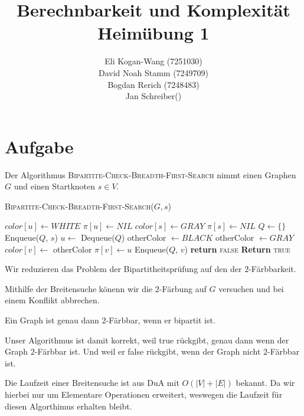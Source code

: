 \documentclass{article}
\newcommand{\zettelNummer}{1}
\newcommand{\studierenderEins}{Eli Kogan-Wang (7251030)}
\newcommand{\studierenderZwei}{David Noah Stamm (7249709)}
\newcommand{\studierenderDrei}{Bogdan Rerich (7248483)}
\newcommand{\studierenderVier}{Jan Schreiber()}
\newcounter{AufgabenCounter}
\newcounter{TeilaufgabenCounter}
\newenvironment{aufgabe}{\section*{Aufgabe \theAufgabenCounter}\setcounter{TeilaufgabenCounter}{1}}{\stepcounter{AufgabenCounter}}
\begin{document}
\title{Berechnbarkeit und Komplexität \\ Heimübung \zettelNummer{}}
\author{\studierenderEins{} \\
  \studierenderZwei{} \\
  \studierenderDrei{} \\
  \studierenderVier{}}

\maketitle

\begin{aufgabe}

  Der Algorithmus \textsc{Bipartite-Check-Breadth-First-Search} nimmt einen Graphen $G$ und einen Startknoten $s\in V$.

  \begin{algorithm}[H]
    \caption{\textsc{Bipartite-Check-Breadth-First-Search}($G, s$)}
    \begin{algorithmic}[1]
      \State $color[u]\gets WHITE$
      \State $\pi[u]\gets NIL$
      \EndFor
      \State $color[s]\gets GRAY$
      \State $\pi[s]\gets NIL$
      \State $Q\gets\{\}$
      \State Enqueue($Q$, $s$)
      \State $u\gets$ Dequeue($Q$)
      \State otherColor $\gets BLACK$
      \Else
      \State otherColor $\gets GRAY$
      \EndIf
       
      \State $color[v]\gets $ otherColor
      \State $\pi[v]\gets u$
      \State Enqueue($Q$, $v$)
      \State \textbf{return} \textsc{false}
      \EndIf
      \EndFor
      \EndWhile
      \State \textbf{Return} \textsc{true}
    \end{algorithmic}
  \end{algorithm}

  Wir reduzieren das Problem der Bipartitheitsprüfung auf den der $2$-Färbbarkeit.

  Mithilfe der Breitensuche könenn wir die $2$-Färbung auf $G$ versuchen und bei einem Konflikt
  abbrechen.

  Ein Graph ist genau dann $2$-Färbbar, wenn er bipartit ist.

  Unser Algorithmus ist damit korrekt, weil true rückgibt, genau dann wenn der Graph $2$-Färbbar ist.
  Und weil er false rückgibt, wenn der Graph nicht $2$-Färbbar ist.

  Die Laufzeit einer Breitensuche ist aus DuA mit $O(|V|+|E|)$ bekannt.
  Da wir hierbei nur um Elementare Operationen erweitert, weswegen die Laufzeit für diesen Algorthimus erhalten bleibt.
\end{aufgabe}
\end{document}
